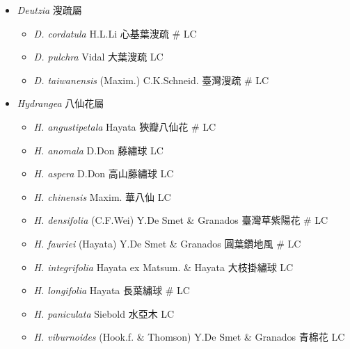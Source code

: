 
  \begin{itemize}
 \item[] \textit{Deutzia} 溲疏屬
                                
  \begin{itemize}
        \item[] \textit{D. cordatula} H.L.Li  心基葉溲疏  \# LC
        \item[] \textit{D. pulchra} Vidal  大葉溲疏   LC
        \item[] \textit{D. taiwanensis} (Maxim.) C.K.Schneid.  臺灣溲疏  \# LC
  \end{itemize}
 \item[] \textit{Hydrangea} 八仙花屬
                                
  \begin{itemize}
        \item[] \textit{H. angustipetala} Hayata  狹瓣八仙花  \# LC
        \item[] \textit{H. anomala} D.Don  藤繡球   LC
        \item[] \textit{H. aspera} D.Don  高山藤繡球   LC
        \item[] \textit{H. chinensis} Maxim.  華八仙   LC
        \item[] \textit{H. densifolia} (C.F.Wei) Y.De Smet \& Granados  臺灣草紫陽花  \# LC
        \item[] \textit{H. fauriei} (Hayata) Y.De Smet \& Granados  圓葉鑽地風  \# LC
        \item[] \textit{H. integrifolia} Hayata ex Matsum. \& Hayata  大枝掛繡球   LC
        \item[] \textit{H. longifolia} Hayata  長葉繡球  \# LC
        \item[] \textit{H. paniculata} Siebold  水亞木   LC
        \item[] \textit{H. viburnoides} (Hook.f. \& Thomson) Y.De Smet \& Granados  青棉花   LC
  \end{itemize}
  \end{itemize}
